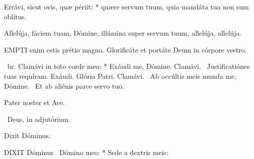 Errávi, sicut ovis, quæ périit: * quære servum tuum, quia mandáta tua non sum oblítus.

 Allelúja, fáciem tuam, Dómine, illúmina super servum tuum, allelúja, allelúja.


\lettrine[lines=2]{E}{MPTI} enim estis prétio magno. Glorificáte et portáte Deum in córpore vestro.

\R\ br. Clamávi in toto corde meo: * Exáudi me, Dómine. Clamávi. \V\ Justificatiónes tuas requíram. Exáudi. Glória Patri. Clamávi. \V\ Ab occúltis meis munda me, Dómine. \R\ Et ab aliénis parce servo tuo.



Pater noster et Ave.

\V\ Deus, in adjutórium.

 Dixit Dóminus. \textdagger



\lettrine[lines=2]{D}{IXIT} Dóminus \textdagger\ Dómino meo: * Sede a dextris meis:

